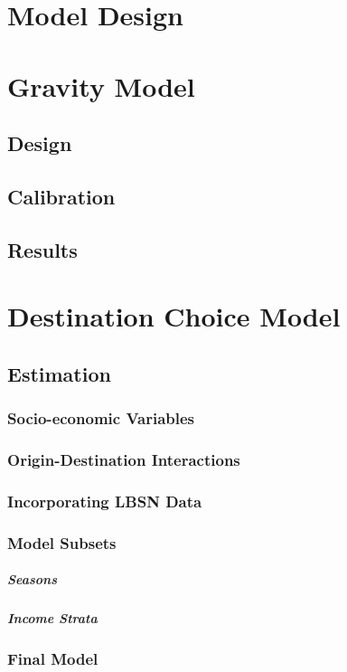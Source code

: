 \chapter{Model Design} 

\chapter{Gravity Model}

\section{Design}
\section{Calibration}
\section{Results}

\chapter{Destination Choice Model}
\section{Estimation}
\subsection{Socio-economic Variables}
\subsection{Origin-Destination Interactions}
\subsection{Incorporating LBSN Data}
\subsection{Model Subsets}
\paragraph{Seasons}
\paragraph{Income Strata}
\subsection{Final Model}


